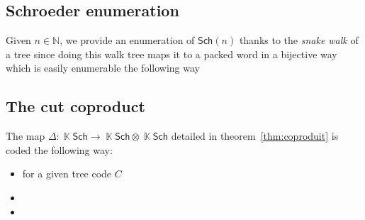 \documentclass[a4paper,10pt]{amsart}
\DeclareMathOperator{\K}{\mathbb{K}}
\newcommand\Sch{\mathsf{Sch}}
\newcommand\NN{\mathbb{N}}
\newcommand{\Schw}{Schroeder} %
\theoremstyle{definition}
\begin{document}
\subsection{\Schw{} enumeration}

Given $n\in\NN$, we provide an enumeration of $\Sch(n)$ thanks to the \emph{snake walk} of a tree since doing this walk tree maps it to a packed word in a bijective way which is easily enumerable the following way

\subsection{The cut coproduct}

The map $\Delta:\K\Sch\rightarrow \K\Sch\otimes \K\Sch$ detailed in theorem~\ref{thm:coproduit} is coded the following way:
\begin{itemize}
	\item for a given tree code $C$
	\item 
	\item 
\end{itemize}






\end{document}
